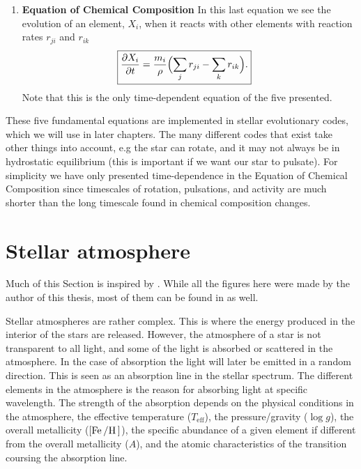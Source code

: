 \begin{enumerate}
    \item \textbf{Equation of Chemical Composition}
        \nicebreak
        In this last equation we see the evolution of an element, $X_i$, when it reacts with other
        elements with reaction rates $r_{ji}$ and $r_{ik}$
        \begin{align}
            \Aboxed{\pd{X_i}{t} &= \frac{m_i}{\rho} \Bigl( \sum_j r_{ji} - \sum_k r_{ik}\Bigr).}
        \end{align}
        Note that this is the only time-dependent equation of the five presented.
\end{enumerate}

These five fundamental equations are implemented in stellar evolutionary codes, which we will use in
later chapters. The many different codes that exist take other things into account, e.g the star can
rotate, and it may not always be in hydrostatic equilibrium (this is important if we want our star
to pulsate). For simplicity we have only presented time-dependence in the Equation of Chemical
Composition since timescales of rotation, pulsations, and activity are much shorter than the long
timescale found in chemical composition changes.


\section{Stellar atmosphere}
\label{sec:stellar_atmosphere}

Much of this Section is inspired by \citet{Gray2006}. While all the figures here were made by the
author of this thesis, most of them can be found in \citet{Gray2006} as well.

Stellar atmospheres are rather complex. This is where the energy produced in the interior of the
stars are released. However, the atmosphere of a star is not transparent to all light, and some of
the light is absorbed or scattered in the atmosphere. In the case of absorption the light will later
be emitted in a random direction. This is seen as an absorption line in the stellar spectrum. The
different elements in the atmosphere is the reason for absorbing light at specific wavelength. The
strength of the absorption depends on the physical conditions in the atmosphere, the effective
temperature ($T_\mathrm{eff}$), the pressure/gravity ($\log g$), the overall metallicity
($[\ion{Fe}/\ion{H}]$), the specific abundance of a given element if different from the overall
metallicity ($A$), and the atomic characteristics of the transition coursing the absorption line.

